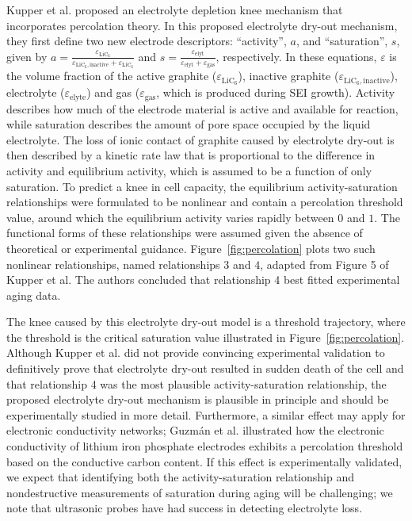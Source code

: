 \documentclass[journal=jpclcd,manuscript=article]{achemso}
\begin{document}
Kupper et al.\cite{kupper_end--life_2018} proposed an electrolyte depletion knee mechanism that incorporates percolation theory. In this proposed electrolyte dry-out mechanism, they first define two new electrode descriptors: ``activity'', $a$, and ``saturation'', $s$, given by $a = \frac{\varepsilon_{\text{LiC}_6}}{\varepsilon_{\text{LiC}_6,\text{inactive}}+\varepsilon_{\text{LiC}_6}}$ and $s = \frac{\varepsilon_\text{elyt}}{\varepsilon_\text{elyt}+\varepsilon_\text{gas}}$, respectively. In these equations, $\varepsilon$ is the volume fraction of the active graphite ($\varepsilon_{\text{LiC}_6}$), inactive graphite ($\varepsilon_{\text{LiC}_6,\text{inactive}}$), electrolyte ($\varepsilon_{\text{elyte}}$) and gas ($\varepsilon_{\text{gas}}$, which is produced during SEI growth). Activity describes how much of the electrode material is active and available for reaction, while saturation describes the amount of pore space occupied by the liquid electrolyte. The loss of ionic contact of graphite caused by electrolyte dry-out is then described by a kinetic rate law that is proportional to the difference in activity and equilibrium activity, which is assumed to be a function of only saturation. To predict a knee in cell capacity, the equilibrium activity-saturation relationships were formulated to be nonlinear and contain a percolation threshold value, around which the equilibrium activity varies rapidly between $0$ and $1$. The functional forms of these relationships were assumed given the absence of theoretical or experimental guidance. Figure~\ref{fig:percolation} plots two such nonlinear relationships, named relationships $3$ and $4$, adapted from Figure 5 of Kupper et al.\cite{kupper_end--life_2018} The authors concluded that relationship 4 best fitted experimental aging data.

The knee caused by this electrolyte dry-out model is a threshold trajectory, where the threshold is the critical saturation value illustrated in Figure~\ref{fig:percolation}. Although Kupper et al.\cite{kupper_end--life_2018} did not provide convincing experimental validation to definitively prove that electrolyte dry-out resulted in sudden death of the cell and that relationship 4 was the most plausible activity-saturation relationship, the proposed electrolyte dry-out mechanism is plausible in principle and should be experimentally studied in more detail. Furthermore, a similar effect may apply for electronic conductivity networks; Guzmán et al. \cite{guzman_improved_2017} illustrated how the electronic conductivity of lithium iron phosphate electrodes exhibits a percolation threshold based on the conductive carbon content.
If this effect is experimentally validated, we expect that identifying both the activity-saturation relationship and nondestructive measurements of saturation during aging will be challenging; we note that ultrasonic probes have had success in detecting electrolyte loss\cite{knehr_understanding_2018, deng_ultrasonic_2020}{}.
\end{document}
